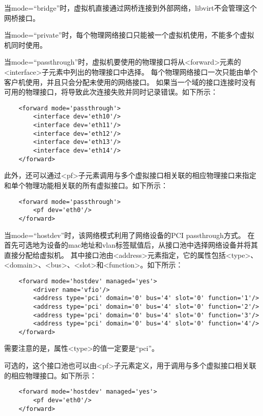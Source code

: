 \documentclass[a4paper,left=2.5cm,right=2.5cm,11pt]{article}
\begin{document}
\begin{itemize}
\begin{itemize}
					当mode=“bridge”时，虚拟机直接通过网桥连接到外部网络，libvirt不会管理这个网桥接口。\par

					当mode=“private”时，每个物理网络接口只能被一个虚拟机使用，不能多个虚拟机同时使用。\par

					当mode=“passthrough”时，虚拟机要使用的物理接口将从<forward>元素的<interface>子元素中列出的物理接口中选择。
					每个物理网络接口一次只能由单个客户机使用，并且只会分配未使用的网络接口。
					如果当一个域的接口连接时没有可用的物理接口，将导致此次连接失败并同时记录错误。如下所示：
					\begin{lstlisting}
	<forward mode='passthrough'>
		<interface dev='eth10'/>
		<interface dev='eth11'/>
		<interface dev='eth12'/>
		<interface dev='eth13'/>
		<interface dev='eth14'/>
	</forward>
					\end{lstlisting}

					此外，还可以通过<pf>子元素调用与多个虚拟接口相关联的相应物理接口来指定和单个物理功能相关联的所有虚拟接口。如下所示：
					\begin{lstlisting}
	<forward mode='passthrough'>
		<pf dev='eth0'/>
	</forward>
					\end{lstlisting}

					当mode=“hostdev”时，该网络模式利用了网络设备的PCI passthrough方式。
					在首先可选地为设备的mac地址和vlan标签赋值后，从接口池中选择网络设备并将其直接分配给虚拟机。
					其中接口池由<address>元素指定，它的属性包括<type>、<domain>、<bus>、<slot>和<function>。如下所示：
					\begin{lstlisting}
	<forward mode='hostdev' managed='yes'>
		<driver name='vfio'/>
		<address type='pci' domain='0' bus='4' slot='0' function='1'/>
		<address type='pci' domain='0' bus='4' slot='0' function='2'/>
		<address type='pci' domain='0' bus='4' slot='0' function='3'/>
		<address type='pci' domain='0' bus='4' slot='0' function='4'/>
	</forward>
					\end{lstlisting}

					需要注意的是，属性<type>的值一定要是“pci”。\par

					可选的，这个接口池也可以由<pf>子元素定义，用于调用与多个虚拟接口相关联的相应物理接口。如下所示：
					\begin{lstlisting}
	<forward mode='hostdev' managed='yes'>
		<pf dev='eth0'/>
	</forward>
					\end{lstlisting}
		\end{itemize}
	\end{itemize}
\end{document}
